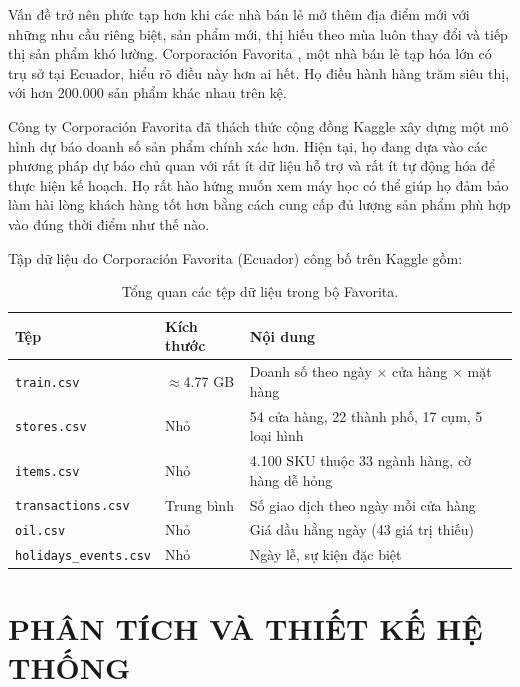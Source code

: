 \documentclass[12pt,a4paper]{report}
\begin{document}
Vấn đề trở nên phức tạp hơn khi các nhà bán lẻ mở thêm địa điểm mới với những nhu cầu riêng biệt, sản phẩm mới, thị hiếu theo mùa luôn thay đổi và tiếp thị sản phẩm khó lường. Corporación Favorita , một nhà bán lẻ tạp hóa lớn có trụ sở tại Ecuador, hiểu rõ điều này hơn ai hết. Họ điều hành hàng trăm siêu thị, với hơn 200.000 sản phẩm khác nhau trên kệ.

Công ty Corporación Favorita đã thách thức cộng đồng Kaggle xây dựng một mô hình dự báo doanh số sản phẩm chính xác hơn. Hiện tại, họ đang dựa vào các phương pháp dự báo chủ quan với rất ít dữ liệu hỗ trợ và rất ít tự động hóa để thực hiện kế hoạch. Họ rất hào hứng muốn xem máy học có thể giúp họ đảm bảo làm hài lòng khách hàng tốt hơn bằng cách cung cấp đủ lượng sản phẩm phù hợp vào đúng thời điểm như thế nào.



Tập dữ liệu do Corporación Favorita (Ecuador) công bố trên Kaggle gồm: 

\begin{table}[h!]
\centering
\small
\renewcommand{\arraystretch}{1.2}
\begin{tabularx}{\textwidth}{@{}llX@{}}
\toprule
\textbf{Tệp} & \textbf{Kích thước} & \textbf{Nội dung} \\
\midrule
\texttt{train.csv} & $\approx$4.77 GB & Doanh số theo ngày $\times$ cửa hàng $\times$ mặt hàng \\
\texttt{stores.csv} & Nhỏ & 54 cửa hàng, 22 thành phố, 17 cụm, 5 loại hình \\
\texttt{items.csv} & Nhỏ & 4.100 SKU thuộc 33 ngành hàng, cờ hàng dễ hỏng \\
\texttt{transactions.csv} & Trung bình & Số giao dịch theo ngày mỗi cửa hàng \\
\texttt{oil.csv} & Nhỏ & Giá dầu hằng ngày (43 giá trị thiếu) \\
\texttt{holidays\_events.csv} & Nhỏ & Ngày lễ, sự kiện đặc biệt \\
\bottomrule
\end{tabularx}
\caption{Tổng quan các tệp dữ liệu trong bộ Favorita.}
\end{table}

\cleardoublepage

\chapter{PHÂN TÍCH VÀ THIẾT KẾ HỆ THỐNG}
\end{document}
